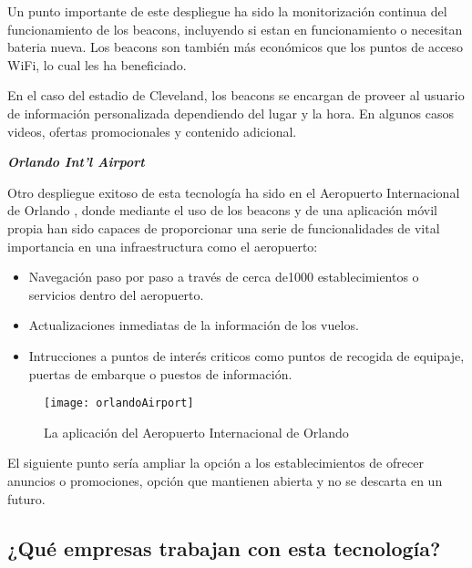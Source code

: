 Un punto importante de este  despliegue ha sido la monitorización continua del funcionamiento de los beacons, incluyendo si estan en funcionamiento o necesitan bateria nueva. Los beacons son también más económicos que los puntos de acceso WiFi, lo cual les ha beneficiado.

En el caso del estadio de Cleveland, los beacons se encargan de proveer al usuario de información personalizada dependiendo del lugar y la hora. En algunos casos videos, ofertas promocionales y contenido adicional.

\vspace{5mm}

\textsl{\textbf{{Orlando Int'l Airport}}}

\vspace{2mm}

Otro despliegue exitoso de esta tecnología ha sido en el Aeropuerto Internacional de Orlando , donde mediante el uso de los beacons y de una aplicación móvil propia han sido capaces de proporcionar una serie de funcionalidades de vital importancia en una infraestructura como el aeropuerto: 

\begin{itemize}
\item Navegación paso por paso a través de cerca de1000 establecimientos o servicios dentro del aeropuerto. 
\item Actualizaciones inmediatas de la información de los vuelos. 
\item Intrucciones a puntos de interés criticos como puntos de recogida de equipaje, puertas de embarque o puestos de información.
\end{itemize}

\begin{figure}[H]
	\centering
	\texttt{[image: orlandoAirport]}
	\caption{La aplicación del Aeropuerto Internacional de Orlando}
	\label{fig:orlandoAirport}
\end{figure}

El siguiente punto sería ampliar la opción a los establecimientos de ofrecer anuncios o promociones, opción que mantienen abierta y no se descarta en un futuro.


\subsection{¿Qué empresas trabajan con esta tecnología?}





